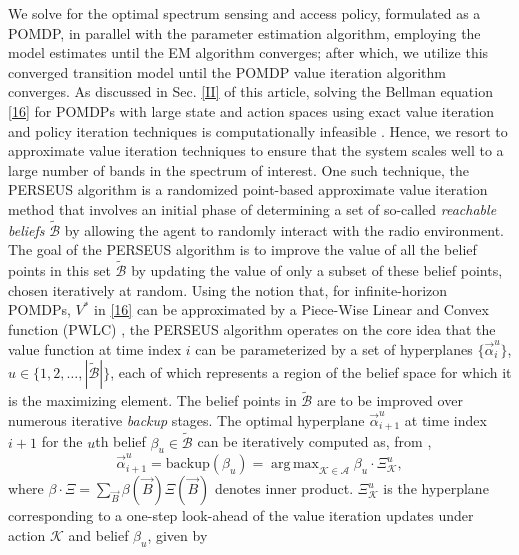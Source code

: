 \documentclass[10pt,twocolumn]{IEEEtran}
\DeclareMathOperator*{\argmax}{arg\,max}
\begin{document}
We solve for the optimal spectrum sensing and access policy, formulated as a POMDP, in parallel with the parameter estimation algorithm, employing the model estimates until the EM algorithm converges; after which, we utilize this converged transition model until the POMDP value iteration algorithm converges. As discussed in Sec. \ref{II} of this article, solving the Bellman equation \eqref{16} for POMDPs with large state and action spaces using exact value iteration and policy iteration techniques is computationally infeasible \cite{DBLP:journals/corr/abs-1109-2145}. Hence, we resort to approximate value iteration techniques to ensure that the system scales well to a large number of bands in the spectrum of interest. One such technique, the PERSEUS algorithm \cite{DBLP:journals/corr/abs-1109-2145} is a randomized point-based approximate value iteration method that involves an initial phase of determining a set of so-called \emph{reachable beliefs} $\tilde{\mathcal{B}}$ by allowing the agent to randomly interact with the radio environment. The goal of the PERSEUS algorithm is to improve the value of all the belief points in this set $\tilde{\mathcal{B}}$ by updating the value of only a subset of these belief points, chosen iteratively at random. Using the notion that, for infinite-horizon POMDPs, $V^*$ in \eqref{16} can be approximated by a Piece-Wise Linear and Convex function (PWLC) \cite{DBLP:journals/corr/abs-1109-2145}, the PERSEUS algorithm operates on the core idea that the value function at time index $i$ can be parameterized by a set of hyperplanes $\{\vec{\alpha}_i^{u}\}$, $u {\in} \{1,2,\dots,|\tilde{\mathcal{B}}|\}$, each of which represents a region of the belief space for which it is the maximizing element. The belief points in $\tilde{\mathcal{B}}$ are to be improved over numerous iterative \emph{backup} stages. The optimal hyperplane $\vec{\alpha}_{i+1}^{u}$ at time index $i{+}1$ for the $u$th belief $\beta_{u} \in \tilde{\mathcal{B}}$ can be iteratively computed as, from \cite{DBLP:journals/corr/abs-1109-2145},
\begin{equation}\label{20}
    \vec{\alpha}_{i+1}^{u} = \text{backup}(\beta_{u}){=}\argmax_{\mathcal{K} \in \mathcal{A}} \beta_u \cdot \Xi_{\mathcal{K}}^{u},
\end{equation}
where $\beta\cdot\Xi{=}\sum_{\vec{B}}\beta(\vec{B})\Xi(\vec{B})$ denotes inner product. $\Xi_{\mathcal{K}}^{u}$ is the hyperplane corresponding to a one-step look-ahead of the value iteration updates under action $\mathcal K$ and belief $\beta_u$, given by
\end{document}
